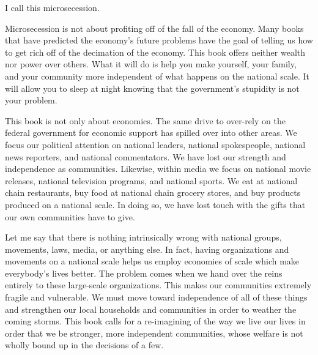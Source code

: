 {\color{black}
I call this microsecession.}

{\color{black}
Microsecession is not about profiting off of the fall of the economy.
Many books that have predicted the economy’s future problems have the
goal of telling us how to get rich off of the decimation of the
economy. This book
\textcolor[rgb]{0.32941177,0.5529412,0.83137256}{offers} neither wealth
nor power over others. What it will do is help you make
you\textcolor[rgb]{0.32941177,0.5529412,0.83137256}{rself}, your
family, and your community more independent of what happens on the
national scale. It will allow you to sleep at night knowing that
\textcolor[rgb]{0.32941177,0.5529412,0.83137256}{the government’s
}stupidity is not your problem.}

{\color{black}
This book is not only about economics. The same drive to over-rely on
the federal government for economic support has spilled over into other
areas. We focus our political attention on national leaders, national
spokespeople, national news reporters, and national commentators. We
have lost our strength and independence as communities. Likewise,
within media we focus on national movie releases, national television
programs, and national sports. We eat at national chain restaurants,
buy food at national chain grocery stores, and buy products produced on
a national scale. In doing so, we have lost touch with the gifts that
our own communities have to give. }

{\color{black}
Let me say that there is nothing intrinsically wrong with national
groups, movements, laws, media, or anything else. In fact, having
organizations and movements on a national scale helps us employ
economies of scale which make everybody’s lives better. The problem
comes when we hand over the reins entirely to these large-scale
organizations. This makes our communities extremely fragile and
vulnerable. We must move toward independence of all of these things and
strengthen our local households and communities in order to weather the
coming storms. This book calls for a re-imagining of the way we live
our lives in order that we be stronger, more independent communities,
whose welfare is not wholly bound up in the decisions of a few.}

